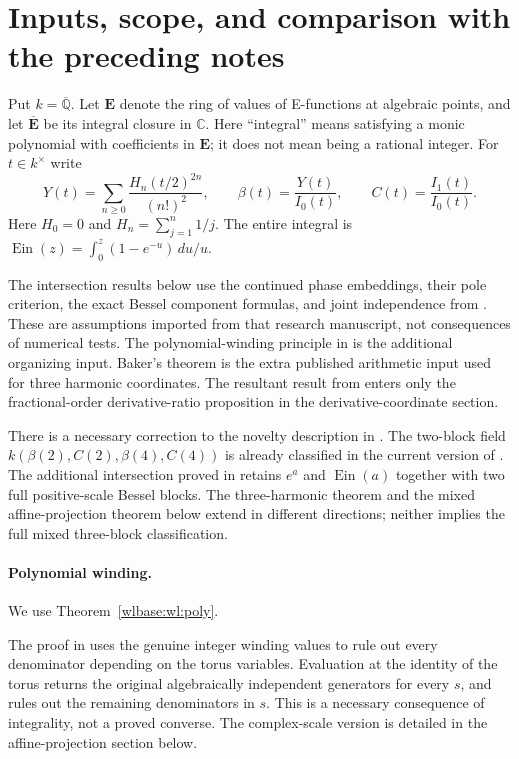 \documentclass[11pt,a4paper]{article}
\theoremstyle{definition}\newtheorem{definition}[theorem]{Definition}
\theoremstyle{remark}\newtheorem{remark}[theorem]{Remark}
\newcommand{\Ein}{\operatorname{Ein}}
\begin{document}
\section{Inputs, scope, and comparison with the preceding notes}
Put $k=\overline{\mathbb Q}$. Let $\mathbf E$ denote the ring of values of
E-functions at algebraic points, and let $\overline{\mathbf E}$ be its
integral closure in $\mathbb C$. Here ``integral'' means satisfying a monic
polynomial with coefficients in $\mathbf E$; it does not mean being a
rational integer. For $t\in k^\times$ write
\[
 Y(t)=\sum_{n\ge0}\frac{H_n(t/2)^{2n}}{(n!)^2},\qquad
 \beta(t)=\frac{Y(t)}{I_0(t)},\qquad C(t)=\frac{I_1(t)}{I_0(t)}.
\]
Here $H_0=0$ and $H_n=\sum_{j=1}^n1/j$. The entire integral is
$\Ein(z)=\int_0^z(1-e^{-u})\,du/u$.

The intersection results below use the continued phase embeddings, their
pole criterion, the exact Bessel component formulas, and joint
independence from \cite{EB}. These are assumptions imported from that
research manuscript, not consequences of numerical tests. The
polynomial-winding principle in \cite{WL} is the additional organizing
input. Baker's theorem is the extra published arithmetic input used for
three harmonic coordinates. The resultant result from \cite{BR} enters
only the fractional-order derivative-ratio proposition in the
derivative-coordinate section.

There is a necessary correction to the novelty description in \cite{WL}.
The two-block field $k(\beta(2),C(2),\beta(4),C(4))$ is already classified
in the current version of \cite[Theorems \texttt{tbr:main},
\texttt{ctb:main}]{EB}. The additional intersection proved in \cite{WL}
retains $e^a$ and $\Ein(a)$ together with two full positive-scale Bessel
blocks. The three-harmonic theorem and the mixed affine-projection theorem
below extend in different directions; neither implies the full mixed
three-block classification.

\paragraph{Polynomial winding.} We use Theorem~\ref{wlbase:wl:poly}.

The proof in \cite{WL} uses the genuine integer winding values to rule
out every denominator depending on the torus variables. Evaluation at
the identity of the torus returns the original algebraically independent
generators for every $s$, and rules out the remaining denominators in
$s$. This is a necessary consequence of integrality, not a proved
converse. The complex-scale version is detailed in the affine-projection
section below.
\end{document}
